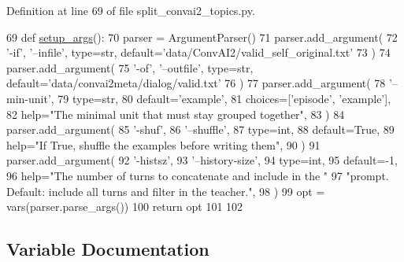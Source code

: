 Definition at line 69 of file split\+\_\+convai2\+\_\+topics.\+py.


\begin{DoxyCode}
69 \textcolor{keyword}{def }\hyperlink{namespaceprojects_1_1self__feeding_1_1scripts_1_1split__convai2__topics_a182c9e1c2ca6bd71added31ed7088eee}{setup\_args}():
70     parser = ArgumentParser()
71     parser.add\_argument(
72         \textcolor{stringliteral}{'-if'}, \textcolor{stringliteral}{'--infile'}, type=str, default=\textcolor{stringliteral}{'data/ConvAI2/valid\_self\_original.txt'}
73     )
74     parser.add\_argument(
75         \textcolor{stringliteral}{'-of'}, \textcolor{stringliteral}{'--outfile'}, type=str, default=\textcolor{stringliteral}{'data/convai2meta/dialog/valid.txt'}
76     )
77     parser.add\_argument(
78         \textcolor{stringliteral}{'--min-unit'},
79         type=str,
80         default=\textcolor{stringliteral}{'example'},
81         choices=[\textcolor{stringliteral}{'episode'}, \textcolor{stringliteral}{'example'}],
82         help=\textcolor{stringliteral}{"The minimal unit that must stay grouped together"},
83     )
84     parser.add\_argument(
85         \textcolor{stringliteral}{'-shuf'},
86         \textcolor{stringliteral}{'--shuffle'},
87         type=int,
88         default=\textcolor{keyword}{True},
89         help=\textcolor{stringliteral}{"If True, shuffle the examples before writing them"},
90     )
91     parser.add\_argument(
92         \textcolor{stringliteral}{'-histsz'},
93         \textcolor{stringliteral}{'--history-size'},
94         type=int,
95         default=-1,
96         help=\textcolor{stringliteral}{"The number of turns to concatenate and include in the "}
97         \textcolor{stringliteral}{"prompt. Default: include all turns and filter in the teacher."},
98     )
99     opt = vars(parser.parse\_args())
100     \textcolor{keywordflow}{return} opt
101 
102 
\end{DoxyCode}


\subsection{Variable Documentation}
\mbox{\label{namespaceprojects_1_1self__feeding_1_1scripts_1_1split__convai2__topics_afcf2d3a3ba026d41f6d5cf107671635c}} 
